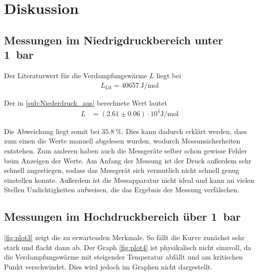 \section{Diskussion}
\label{sec:Diskussion}

\subsection{Messungen im Niedrigdruckbereich unter \qty{1}{\bar}}
Der Literaturwert für die Verdampfungswärme $L$ liegt bei 
\begin{align*}
    L_{\text{Lit}}=\qty{40657}{\joule\per\mol}
\end{align*}\cite{Verdampfungswärme}

Der in \autoref{sub:Niederdruck_aus} berechnete Wert lautet
\begin{align}
    L &= (2.61\pm 0.06)\cdot 10^4 \si{\joule\per\mol}
\end{align} 

Die Abweichung liegt somit bei $\qty{35.8}{\percent}$.
Dies kann dadurch erklärt werden, dass zum einen die Werte manuell abgelesen wurden, wodurch Messunsicherheiten entstehen.
Zum anderen haben auch die Messgeräte selber schon gewisse Fehler beim Anzeigen der Werte. Am Anfang der Messung ist der Druck außerdem sehr schnell angestiegen,
sodass das Messgerät sich vermutlich nicht schnell genug einstellen konnte. 
Außerdem ist die Messapparatur nicht ideal und kann an vielen Stellen Undichtigkeiten aufweisen, die das Ergebnis der Messung verfälschen.

\subsection{Messungen im Hochdruckbereich über \qty{1}{\bar}}
\autoref{fig:plot3} zeigt die zu erwartenden Merkmale. So fällt die Kurve zunächst sehr stark und flacht dann ab.
Der Graph \ref{fig:plot4} ist physikalisch nicht sinnvoll, da die Verdampfungswärme mit steigender Temperatur abfällt und am kritischen Punkt verschwindet.
Dies wird jedoch im Graphen nicht dargestellt.